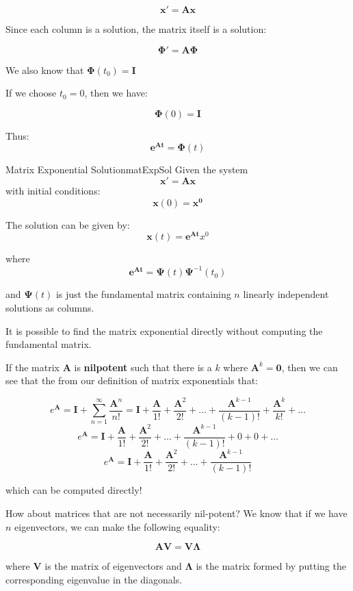 \documentclass{report}
\begin{document}
$$\mathbf{x}' = \mathbf{Ax}$$

Since each column is a solution, the matrix itself is a solution:

$$\mathbf{\Phi}' = \mathbf{A\Phi}$$

We also know that $\mathbf{\Phi}(t_0) = \mathbf{I}$

If we choose $t_0 = 0$, then we have:

$$\mathbf{\Phi}(0) = \mathbf{I}$$

Thus:
$$\mathbf{e^{\mathbf{A}t}} = \mathbf{\Phi}(t)$$



\begin{mytheo}{Matrix Exponential Solution}{matExpSol}
    Given the system
    $$\mathbf{x'} = \mathbf{Ax}$$
    with initial conditions:
    $$\mathbf{x}(0) = \mathbf{x^0}$$
    
    The solution can be given by:
    $$\mathbf{x}(t) = \mathbf{e^{\mathbf{A}t}}x^0$$
    
    where 
    $$\mathbf{e^{\mathbf{A}t}}= \mathbf{\Psi}(t)\mathbf{\Psi}^{-1}(t_0)$$
    
    and $\mathbf{\Psi}(t)$ is just the fundamental matrix containing $n$ linearly independent solutions as columns.
\end{mytheo}

It is possible to find the matrix exponential directly without computing the fundamental matrix. 

If the matrix $\mathbf{A}$ is \textbf{nilpotent} such that there is a $k$ where $\mathbf{A}^k = \mathbf{0}$, then we can see that the from our definition of matrix exponentials that:

$$e^{\mathbf{A}} = \mathbf{I} + \sum_{n=1}^\infty \frac{\mathbf{A}^n}{n!} = \mathbf{I} + \frac{\mathbf{A}}{1!} + \frac{\mathbf{A}^2}{2!} + \dots + \frac{\mathbf{A}^{k-1}}{(k-1)!} + \frac{\mathbf{A}^k}{k!} + \dots$$
$$e^{\mathbf{A}} = \mathbf{I} + \frac{\mathbf{A}}{1!} + \frac{\mathbf{A}^2}{2!} + \dots + \frac{\mathbf{A}^{k-1}}{(k-1)!} + 0 + 0 + \dots$$
$$e^{\mathbf{A}} = \mathbf{I} + \frac{\mathbf{A}}{1!} + \frac{\mathbf{A}^2}{2!} + \dots + \frac{\mathbf{A}^{k-1}}{(k-1)!}$$

which can be computed directly!

How about matrices that are not necessarily nil-potent? 
We know that if we have $n$ eigenvectors, we can make the following equality:

$$\mathbf{AV} = \mathbf{V\Lambda}$$

where $\mathbf{V}$ is the matrix of eigenvectors and $\mathbf{\Lambda}$ is the matrix formed by putting the corresponding eigenvalue in the diagonals.
\end{document}
